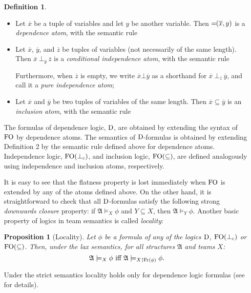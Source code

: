 \documentclass{article}
\theoremstyle{plain}
\newtheorem{proposition}[theorem]{Proposition}
\theoremstyle{definition}
\newtheorem{definition}[theorem]{Definition}
\newcommand{\mA}{{\mathfrak A}}
\newcommand{\Fr}{{\rm Fr}}
\newcommand*\dep{{=\mkern-1.2mu}}
\newcommand{\df}{\rm{D}}
\newcommand{\FOinclusion}{{\rm FO(\subseteq)}}
\newcommand{\fo}{{\rm FO}}
\newcommand{\tu}[1]{\overline{#1}}
\newcommand{\indep}[3]{{#1}\ \bot_{#2}\ {#3}}
\newcommand{\indlogic}{\rm{FO} (\bot_{\rm c})}
\begin{document}
\begin{definition}
\begin{itemize}
\item Let $\tu x$ be a tuple of variables and let $y$ be another variable. Then $\dep(\tu x, y)$ is a \emph{dependence atom}, with the semantic rule
\item Let $\tu x$, $\tu y$, and $\tu z$ be tuples of variables (not necessarily of the same length). Then $\indep{\tu x}{\tu y}{\tu z}$ is a \emph{conditional independence atom}, with the semantic rule
Furthermore, when $\tu z$ is empty, we write ${\tu x}\bot{\tu y}$ as a shorthand for $\indep{\tu x} {\tu z}  {\tu y}$, and  call it a \emph{pure independence atom};
\item Let $\tu x$ and $\tu y$ be two tuples of variables of the same length. Then $\tu x \subseteq \tu y$ is an \emph{inclusion atom}, with the semantic rule 
\end{itemize}
\end{definition}
The formulas of dependence logic, $\df$, are obtained by extending the syntax of $\fo$ by dependence atoms. The semantics of $\df$-formulas is obtained by extending Definition 2 by the semantic rule defined above for dependence atoms.  Independence logic, $\indlogic$, and inclusion logic, $\FOinclusion$, are defined analogously using independence and inclusion atoms, respectively.


It is easy to see that the flatness property is lost immediately when $\fo$ is extended by any of the atoms defined above. On the other hand,  it is straightforward to check that all $\df$-formulas satisfy the following  strong \emph{downwards closure} property:  if $\mA \models_X \phi$ and   $Y\subseteq X$, then $\mA \models_Y \phi$.
Another basic property of logics in team semantics is called \emph{locality}:
\begin{proposition}[Locality]
Let  $\phi$ be a formula of any of the logics  $\df$,  $\indlogic$ or $\FOinclusion$. Then, under the lax semantics, for all structures  $\mA$  and teams  $X$:
 $$\mA \models_X \phi \mbox{ iff }    \mA \models_{X \upharpoonright \Fr(\phi)} \phi.$$
\end{proposition}
Under the strict semantics locality  holds only for dependence logic formulas (see \cite{galliani12} for details).
\end{document}
